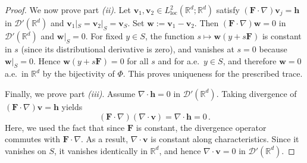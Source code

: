 \documentclass[12pt]{article}
\newtheorem{lemma}{Lemma}
\begin{document}
\begin{proof}
We now prove part \textit{(ii)}. Let $\boldsymbol v_1,\boldsymbol v_2\in L^2_{\mathrm{loc}}(\mathbb R^d;\mathbb R^d)$ satisfy
$(\mathbf F\cdot\nabla)\boldsymbol v_j={{} \boldsymbol h}$ in $\mathcal D'(\mathbb R^d)$ and
$\boldsymbol v_1|_S=\boldsymbol v_2|_S=\boldsymbol v_S$. Set $\boldsymbol w:=\boldsymbol v_1-\boldsymbol v_2$.
Then $(\mathbf F\cdot\nabla)\boldsymbol w=0$ in $\mathcal D'(\mathbb R^d)$ and $\boldsymbol w|_S=0$.
For fixed $y\in S$, the function $s\mapsto \boldsymbol w(y+s\mathbf F)$ is constant in $s$
(since its distributional derivative is zero), and vanishes at $s=0$ because $\boldsymbol w|_S=0$.
Hence $\boldsymbol w(y+s\mathbf F)=0$ for all $s$ and for a.e.\ $y\in S$, and therefore $\boldsymbol w=0$
a.e.\ in $\mathbb R^d$ by the bijectivity of $\Phi$. This proves uniqueness for the prescribed trace.

Finally, we prove part \textit{(iii)}. Assume $\nabla\cdot\boldsymbol h=0$ in $\mathcal D'(\mathbb R^d)$. Taking divergence of
$(\mathbf F\cdot\nabla)\boldsymbol v={{} \boldsymbol h}$ yields
\[
(\mathbf F\cdot\nabla)(\nabla\cdot\boldsymbol v)={{} \nabla\cdot\boldsymbol h}=0\,.
\]
Here, we used the fact that since $\mathbf F$ is constant, the divergence operator commutes with $\mathbf F\cdot\nabla$. As a result, $\nabla\cdot\boldsymbol v$ is constant along characteristics. Since it vanishes on $S$, it vanishes identically in $\mathbb R^d$, and hence
$\nabla\cdot\boldsymbol v=0$ in $\mathcal D'(\mathbb R^d)$.
\end{proof}













	
        
\end{document}
